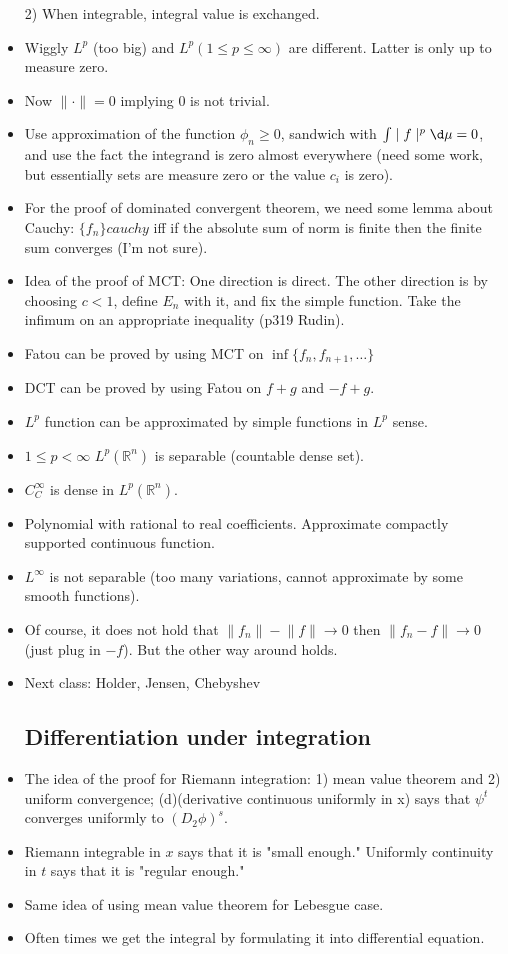 \documentclass{article}
\theoremstyle{remark}
\begin{document}
\begin{itemize}
2) When integrable, integral value is exchanged.
\item Wiggly $L^p$ (too big) and $L^p(1\leq p\leq\infty)$ are different. Latter is only up to measure zero.
\item Now $\lVert\cdot\rVert=0$ implying $0$ is not trivial.
\item Use approximation of the function $\phi_n\geq 0$, sandwich with $\int\mid f\mid^p\d\mu=0$, and use the fact the integrand is zero almost everywhere (need some work, but essentially sets are measure zero or the value $c_i$ is zero).
\item For the proof of dominated convergent theorem, we need some lemma about Cauchy: $\{f_n\} cauchy$ iff if the absolute sum of norm is finite then the finite sum converges (I'm not sure).
\item Idea of the proof of MCT: One direction is direct. The other direction is by choosing $c<1$, define $E_n$ with it, and fix the simple function. Take the infimum on an appropriate inequality (p319 Rudin).
\item Fatou can be proved by using MCT on $\inf \{f_n,f_{n+1},\dots\}$
\item DCT can be proved by using Fatou on $f+g$ and $-f+g$.
\item $L^p$ function can be approximated by simple functions in $L^p$ sense.
\item $1\leq p<\infty$ $L^p(\mathbb{R}^n)$ is separable (countable dense set).
\item $C^\infty_C$ is dense in $L^p(\mathbb{R}^n)$.
\item Polynomial with rational to real coefficients. Approximate compactly supported continuous function. 
\item $L^\infty$ is not separable (too many variations, cannot approximate by some smooth functions).
\item Of course, it does not hold that $\lVert f_n\rVert-\lVert f\rVert\to 0$ then $\lVert f_n-f\rVert\to 0$ (just plug in $-f$). But the other way around holds.
\item Next class: Holder, Jensen, Chebyshev
\subsection*{Differentiation under integration}
\item The idea of the proof for Riemann integration: 1) mean value theorem and 2) uniform convergence; (d)(derivative continuous uniformly in x) says that $\psi^t$ converges uniformly to $(D_2\phi)^s$.
\item Riemann integrable in $x$ says that it is "small enough." Uniformly continuity in $t$ says that it is "regular enough."
\item Same idea of using mean value theorem for Lebesgue case.
\item Often times we get the integral by formulating it into differential equation. 

\end{itemize}
\end{document}
